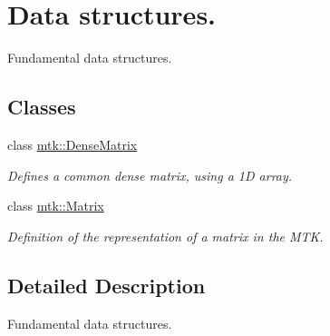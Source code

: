 \hypertarget{group__c04-data__structures}{\section{Data structures.}
\label{group__c04-data__structures}
}


Fundamental data structures.  


\subsection*{Classes}
\begin{DoxyCompactItemize}
\item 
class \hyperlink{classmtk_1_1DenseMatrix}{mtk\+::\+Dense\+Matrix}
\begin{DoxyCompactList}\small\item\em Defines a common dense matrix, using a 1\+D array. \end{DoxyCompactList}\item 
class \hyperlink{classmtk_1_1Matrix}{mtk\+::\+Matrix}
\begin{DoxyCompactList}\small\item\em Definition of the representation of a matrix in the M\+T\+K. \end{DoxyCompactList}\end{DoxyCompactItemize}


\subsection{Detailed Description}
Fundamental data structures. 